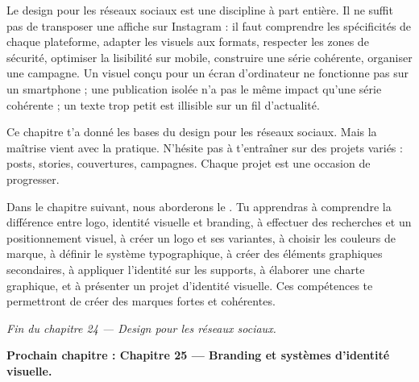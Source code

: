 Le design pour les réseaux sociaux est une discipline à part entière. Il ne suffit pas de transposer une affiche sur Instagram : il faut comprendre les spécificités de chaque plateforme, adapter les visuels aux formats, respecter les zones de sécurité, optimiser la lisibilité sur mobile, construire une série cohérente, organiser une campagne. Un visuel conçu pour un écran d'ordinateur ne fonctionne pas sur un smartphone ; une publication isolée n'a pas le même impact qu'une série cohérente ; un texte trop petit est illisible sur un fil d'actualité.

Ce chapitre t'a donné les bases du design pour les réseaux sociaux. Mais la maîtrise vient avec la pratique. N'hésite pas à t'entraîner sur des projets variés : posts, stories, couvertures, campagnes. Chaque projet est une occasion de progresser.

Dans le chapitre suivant, nous aborderons le . Tu apprendras à comprendre la différence entre logo, identité visuelle et branding, à effectuer des recherches et un positionnement visuel, à créer un logo et ses variantes, à choisir les couleurs de marque, à définir le système typographique, à créer des éléments graphiques secondaires, à appliquer l'identité sur les supports, à élaborer une charte graphique, et à présenter un projet d'identité visuelle. Ces compétences te permettront de créer des marques fortes et cohérentes.

\vspace{2em}

\begin{center}
\textit{Fin du chapitre 24 --- Design pour les réseaux sociaux.}

\vspace{1em}

\textbf{Prochain chapitre : Chapitre 25 --- Branding et systèmes d'identité visuelle.}
\end{center}